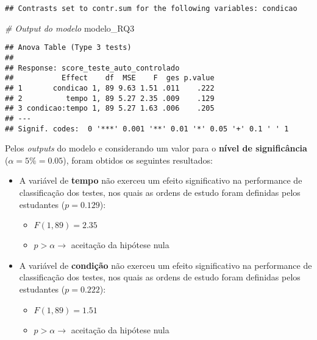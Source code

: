 \documentclass[
]{article}
\newenvironment{Shaded}{\begin{snugshade}}{\end{snugshade}}
\newcommand{\CommentTok}[1]{\textcolor[rgb]{0.56,0.35,0.01}{\textit{#1}}}
\newcommand{\NormalTok}[1]{#1}
\providecommand{\tightlist}{%
  \setlength{\itemsep}{0pt}\setlength{\parskip}{0pt}}
\begin{document}
\begin{verbatim}
## Contrasts set to contr.sum for the following variables: condicao
\end{verbatim}

\begin{Shaded}
\begin{Highlighting}[]
\CommentTok{\# Output do modelo}
\NormalTok{modelo\_RQ3}
\end{Highlighting}
\end{Shaded}

\begin{verbatim}
## Anova Table (Type 3 tests)
## 
## Response: score_teste_auto_controlado
##           Effect    df  MSE    F  ges p.value
## 1       condicao 1, 89 9.63 1.51 .011    .222
## 2          tempo 1, 89 5.27 2.35 .009    .129
## 3 condicao:tempo 1, 89 5.27 1.63 .006    .205
## ---
## Signif. codes:  0 '***' 0.001 '**' 0.01 '*' 0.05 '+' 0.1 ' ' 1
\end{verbatim}

Pelos \emph{outputs} do modelo e considerando um valor para o
\textbf{nível de significância} (\(\alpha = 5\% = 0.05\)), foram obtidos
os seguintes resultados:

\begin{itemize}
\item
  A variável de \textbf{tempo} não exerceu um efeito significativo na
  performance de classificação dos testes, nos quais as ordens de estudo
  foram definidas pelos estudantes (\(p = 0.129\)):

  \begin{itemize}
  \tightlist
  \item
    \(F(1, 89) = 2.35\)
  \item
    \(p > \alpha \rightarrow\) aceitação da hipótese nula
  \end{itemize}
\end{itemize}

\begin{itemize}
\item
  A variável de \textbf{condição} não exerceu um efeito significativo na
  performance de classificação dos testes, nos quais as ordens de estudo
  foram definidas pelos estudantes (\(p = 0.222\)):

  \begin{itemize}
  \tightlist
  \item
    \(F(1, 89) = 1.51\)
  \item
    \(p > \alpha \rightarrow\) aceitação da hipótese nula
  \end{itemize}
\end{itemize}
\end{document}
